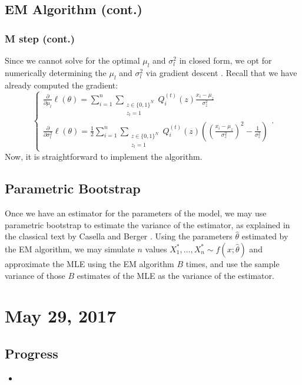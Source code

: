 \documentclass{article}
\begin{document}
\subsection{EM Algorithm (cont.)}
\subsubsection{M step (cont.)}
Since we cannot solve for the optimal $\mu_l$ and $\sigma_l^2$ in closed form, we opt for numerically determining the $\mu_l$ and $\sigma_l^2$ via gradient descent \cite{bishop2006pattern}. Recall that we have already computed the gradient:
\[
  \begin{cases}
    \frac{\partial}{\partial\mu_l}\ell(\theta) = \sum_{i=1}^n\sum_{\substack{z\in\{0,1\}^N \\ z_l = 1}} Q_i^{(t)}(z)\frac{x_i-\mu_z}{\sigma_z^2} \\
    \frac{\partial}{\partial\sigma_l^2}\ell(\theta) = \frac12\sum_{i=1}^n\sum_{\substack{z\in\{0,1\}^N \\ z_l = 1}} Q_i^{(t)}(z)\left(\left(\frac{x_i-\mu_z}{\sigma_z^2}\right)^2-\frac1{\sigma_z^2}\right)
  \end{cases}.
\]
Now, it is straightforward to implement the algorithm.

\subsection{Parametric Bootstrap}
Once we have an estimator for the parameters of the model, we may use parametric bootstrap to estimate the variance of the estimator, as explained in the classical text by Casella and Berger \cite{casella2002statistical}. Using the parameters $\hat\theta$ estimated by the EM algorithm, we may simulate $n$ values $X_1^*, \dots, X_n^*\sim f(x;\hat\theta)$ and approximate the MLE using the EM algorithm $B$ times, and use the sample variance of those $B$ estimates of the MLE as the variance of the estimator.

\section{May 29, 2017}
\subsection{Progress}
\begin{itemize}
  \item
\end{itemize}



\end{document}
